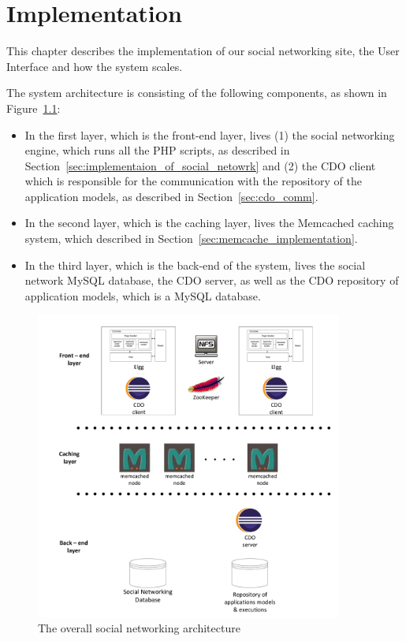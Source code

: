 \chapter{Implementation}
\label{chap:implementation}
This chapter describes the implementation of our social networking site, the User Interface and how the system scales.

The system architecture is consisting of the following components, as shown in Figure~\ref{fig:system_architecture}: 
\begin{itemize}
\item In the first layer, which is the front-end layer, lives (1) the social networking engine, which runs all the PHP scripts, as described in Section~\ref{sec:implementaion_of_social_netowrk} and (2) the CDO client which is responsible for the communication with the repository of the application models, as described in Section~\ref{sec:cdo_comm}. 
\item In the second layer, which is the caching layer, lives the Memcached caching system, which described in Section~\ref{sec:memcache_implementation}. 
\item In the third layer, which is the back-end of the system, lives the social network MySQL database, the CDO server, as well as the CDO repository of application models, which is a MySQL database. 

\end{itemize}
\begin{figure}[h]
	\centering
	\includegraphics[width=0.9\textwidth,natwidth=200,natheight=150]{./fig/system_architecture.pdf}
	\caption{The overall social networking architecture}
	\label{fig:system_architecture}
\end{figure}

